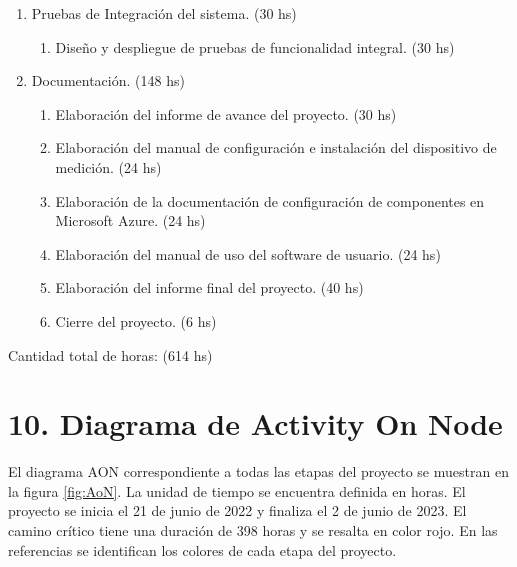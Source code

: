 \documentclass[
11pt, %
]{charter}
\begin{document}
\begin{enumerate}
\item Pruebas de Integración del sistema. (30 hs)
	\begin{enumerate}
	\item Diseño y despliegue de pruebas de funcionalidad integral. (30 hs)
	\end{enumerate}

\item Documentación. (148 hs)
	\begin{enumerate}
	\item Elaboración del informe de avance del proyecto. (30 hs)
	\item Elaboración del manual de configuración e instalación del dispositivo de medición. (24 hs)
	\item Elaboración de la documentación de configuración de componentes en Microsoft Azure. (24 hs)
	\item Elaboración del manual de uso del software de usuario. (24 hs)
	\item Elaboración del informe final del proyecto. (40 hs)
	\item Cierre del proyecto. (6 hs)
	\end{enumerate}
	
\end{enumerate}

Cantidad total de horas: (614 hs)



\section{10. Diagrama de Activity On Node}
\label{sec:AoN}


El diagrama AON correspondiente a todas las etapas del proyecto se muestran en la figura \ref{fig:AoN}. La unidad de tiempo se encuentra definida en horas.
El proyecto se inicia el 21 de junio de 2022 y finaliza el 2 de junio de 2023.
El camino crítico tiene una duración de 398 horas y se resalta en color rojo.
En las referencias se identifican los colores de cada etapa del proyecto. 
\end{document}
